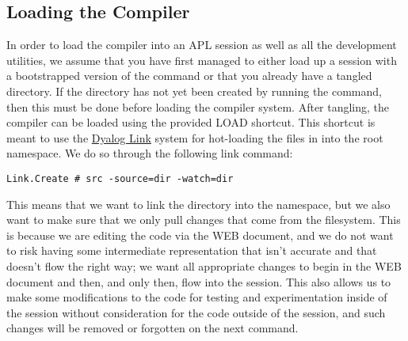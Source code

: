 \documentclass{article}%
\begin{document}
%
%
%
%
%
%
%
%
%
%
%
%
%
%
%
%
%
%
%
\nwdocspar

\subsection{Loading the Compiler}

In order to load the compiler into an APL session as well as all the
development utilities,
we assume that you have first managed to either load up a session
with a bootstrapped version of the {\Tt{}\nwendquote} command or that you
already have a tangled {\Tt{}\nwendquote} directory.
If the {\Tt{}\nwendquote} directory has not yet been created by running the
{\Tt{}\nwendquote} command,
then this must be done before loading the compiler system.
After tangling,
the compiler can be loaded using the provided {\Tt{}LOAD\nwendquote} shortcut.
This shortcut is meant to use the
\href{https://github.com/Dyalog/link}{Dyalog Link}
system for hot-loading the files in {\Tt{}\nwendquote} into the root namespace.
We do so through the following link command:

\begin{verbatim}
Link.Create # src -source=dir -watch=dir
\end{verbatim}

\noindent
This means that we want to link the {\Tt{}\nwendquote} directory into the {\Tt{}{\#}\nwendquote}
namespace,
but we also want to make sure that we only pull changes that come
from the filesystem.
This is because we are editing the code via the WEB document,
and we do not want to risk having some intermediate representation
that isn't accurate and that doesn't flow the right way;
we want all appropriate changes to begin in the WEB document
and then, and only then, flow into the session.
This also allows us to make some modifications to the code for testing
and experimentation inside of the session without consideration
for the code outside of the session,
and such changes will be removed or forgotten on the next {\Tt{}\nwendquote}
command.
\end{document}
